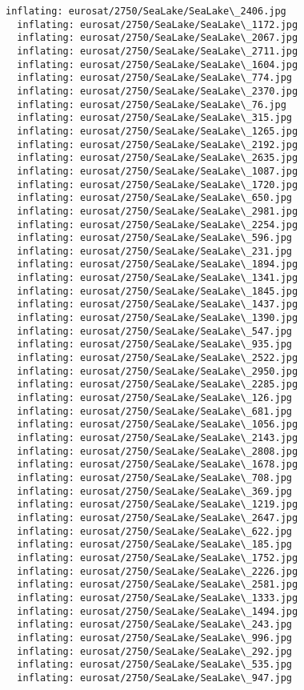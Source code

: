 \documentclass[11pt]{article}
\begin{document}
\begin{Verbatim}[commandchars=\\\{\}]
  inflating: eurosat/2750/SeaLake/SeaLake\_2406.jpg
  inflating: eurosat/2750/SeaLake/SeaLake\_1172.jpg
  inflating: eurosat/2750/SeaLake/SeaLake\_2067.jpg
  inflating: eurosat/2750/SeaLake/SeaLake\_2711.jpg
  inflating: eurosat/2750/SeaLake/SeaLake\_1604.jpg
  inflating: eurosat/2750/SeaLake/SeaLake\_774.jpg
  inflating: eurosat/2750/SeaLake/SeaLake\_2370.jpg
  inflating: eurosat/2750/SeaLake/SeaLake\_76.jpg
  inflating: eurosat/2750/SeaLake/SeaLake\_315.jpg
  inflating: eurosat/2750/SeaLake/SeaLake\_1265.jpg
  inflating: eurosat/2750/SeaLake/SeaLake\_2192.jpg
  inflating: eurosat/2750/SeaLake/SeaLake\_2635.jpg
  inflating: eurosat/2750/SeaLake/SeaLake\_1087.jpg
  inflating: eurosat/2750/SeaLake/SeaLake\_1720.jpg
  inflating: eurosat/2750/SeaLake/SeaLake\_650.jpg
  inflating: eurosat/2750/SeaLake/SeaLake\_2981.jpg
  inflating: eurosat/2750/SeaLake/SeaLake\_2254.jpg
  inflating: eurosat/2750/SeaLake/SeaLake\_596.jpg
  inflating: eurosat/2750/SeaLake/SeaLake\_231.jpg
  inflating: eurosat/2750/SeaLake/SeaLake\_1894.jpg
  inflating: eurosat/2750/SeaLake/SeaLake\_1341.jpg
  inflating: eurosat/2750/SeaLake/SeaLake\_1845.jpg
  inflating: eurosat/2750/SeaLake/SeaLake\_1437.jpg
  inflating: eurosat/2750/SeaLake/SeaLake\_1390.jpg
  inflating: eurosat/2750/SeaLake/SeaLake\_547.jpg
  inflating: eurosat/2750/SeaLake/SeaLake\_935.jpg
  inflating: eurosat/2750/SeaLake/SeaLake\_2522.jpg
  inflating: eurosat/2750/SeaLake/SeaLake\_2950.jpg
  inflating: eurosat/2750/SeaLake/SeaLake\_2285.jpg
  inflating: eurosat/2750/SeaLake/SeaLake\_126.jpg
  inflating: eurosat/2750/SeaLake/SeaLake\_681.jpg
  inflating: eurosat/2750/SeaLake/SeaLake\_1056.jpg
  inflating: eurosat/2750/SeaLake/SeaLake\_2143.jpg
  inflating: eurosat/2750/SeaLake/SeaLake\_2808.jpg
  inflating: eurosat/2750/SeaLake/SeaLake\_1678.jpg
  inflating: eurosat/2750/SeaLake/SeaLake\_708.jpg
  inflating: eurosat/2750/SeaLake/SeaLake\_369.jpg
  inflating: eurosat/2750/SeaLake/SeaLake\_1219.jpg
  inflating: eurosat/2750/SeaLake/SeaLake\_2647.jpg
  inflating: eurosat/2750/SeaLake/SeaLake\_622.jpg
  inflating: eurosat/2750/SeaLake/SeaLake\_185.jpg
  inflating: eurosat/2750/SeaLake/SeaLake\_1752.jpg
  inflating: eurosat/2750/SeaLake/SeaLake\_2226.jpg
  inflating: eurosat/2750/SeaLake/SeaLake\_2581.jpg
  inflating: eurosat/2750/SeaLake/SeaLake\_1333.jpg
  inflating: eurosat/2750/SeaLake/SeaLake\_1494.jpg
  inflating: eurosat/2750/SeaLake/SeaLake\_243.jpg
  inflating: eurosat/2750/SeaLake/SeaLake\_996.jpg
  inflating: eurosat/2750/SeaLake/SeaLake\_292.jpg
  inflating: eurosat/2750/SeaLake/SeaLake\_535.jpg
  inflating: eurosat/2750/SeaLake/SeaLake\_947.jpg

\end{Verbatim}
\end{document}
